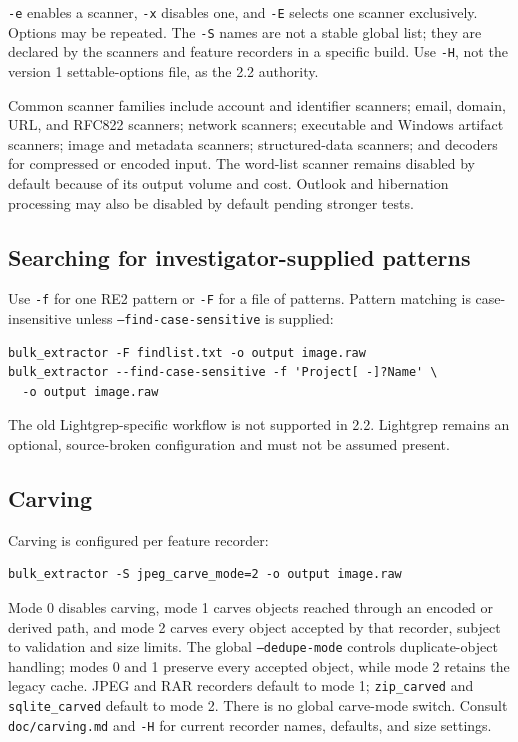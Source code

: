\documentclass[11pt]{article}
\newcommand{\code}[1]{\texttt{#1}}
\begin{document}
\code{-e} enables a scanner, \code{-x} disables one, and \code{-E} selects
one scanner exclusively. Options may be repeated. The \code{-S} names are not
a stable global list; they are declared by the scanners and feature recorders
in a specific build. Use \code{-H}, not the version 1 settable-options file,
as the 2.2 authority.

Common scanner families include account and identifier scanners; email,
domain, URL, and RFC822 scanners; network scanners; executable and Windows
artifact scanners; image and metadata scanners; structured-data scanners; and
decoders for compressed or encoded input. The word-list scanner remains
disabled by default because of its output volume and cost. Outlook and
hibernation processing may also be disabled by default pending stronger tests.

\subsection{Searching for investigator-supplied patterns}

Use \code{-f} for one RE2 pattern or \code{-F} for a file of patterns. Pattern
matching is case-insensitive unless \code{--find-case-sensitive} is supplied:

\begin{Verbatim}
bulk_extractor -F findlist.txt -o output image.raw
bulk_extractor --find-case-sensitive -f 'Project[ -]?Name' \
  -o output image.raw
\end{Verbatim}

The old Lightgrep-specific workflow is not supported in 2.2. Lightgrep remains
an optional, source-broken configuration and must not be assumed present.

\subsection{Carving}

Carving is configured per feature recorder:

\begin{Verbatim}
bulk_extractor -S jpeg_carve_mode=2 -o output image.raw
\end{Verbatim}

Mode 0 disables carving, mode 1 carves objects reached through an encoded or
derived path, and mode 2 carves every object accepted by that recorder, subject
to validation and size limits. The global \code{--dedupe-mode} controls
duplicate-object handling; modes 0 and 1 preserve every accepted object, while
mode 2 retains the legacy cache. JPEG and RAR recorders default
to mode 1; \code{zip\_carved} and \code{sqlite\_carved} default to mode 2.
There is no global carve-mode switch. Consult \code{doc/carving.md} and
\code{-H} for current recorder names, defaults, and size settings.
\end{document}
